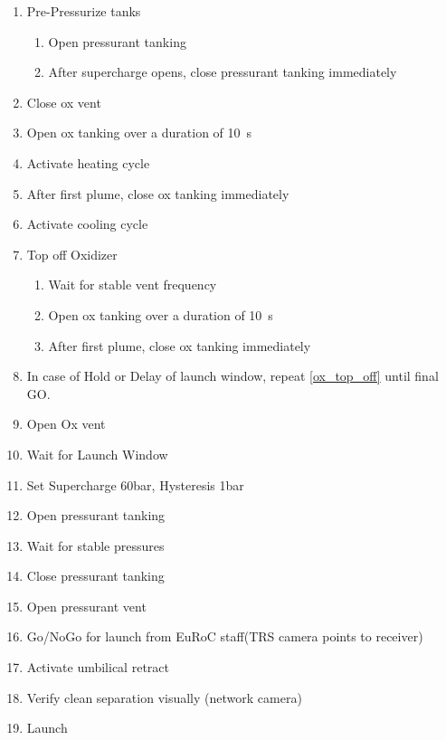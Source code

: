 \begin{enumerate}[label=L\arabic*.]
    \item Pre-Pressurize tanks\checkbox
     \begin{enumerate}[label*=\arabic*.]
            \item Open pressurant tanking \leftcheckbox
            \item After supercharge opens, close pressurant tanking immediately \leftcheckbox
      \end{enumerate}
    \item Close ox vent\checkbox
    \item Open ox tanking over a duration of \SI{10}{\second}\checkbox
    \item Activate heating cycle\checkbox
    \item After first plume, close ox tanking immediately\checkbox
    \item Activate cooling cycle\checkbox
    \item \label{ox_top_off} Top off Oxidizer
        \begin{enumerate}[label*=\arabic*.]
            \item Wait for stable vent frequency \leftcheckbox
            \item Open ox tanking over a duration of \SI{10}{\second} \leftcheckbox
            \item After first plume, close ox tanking immediately \leftcheckbox
        \end{enumerate}
    \item In case of Hold or Delay of launch window, repeat \ref{ox_top_off} until final GO.
    \item Open Ox vent\checkbox
    
    \item Wait for Launch Window\checkbox
    \item Set Supercharge 60bar, Hysteresis 1bar\checkbox
    \item Open pressurant tanking\checkbox
    \item Wait for stable pressures\checkbox
    \item Close pressurant tanking\checkbox    
    \item Open pressurant vent \checkbox
    
    \item Go/NoGo for launch from EuRoC staff\newline (TRS camera points to receiver)\checkbox
    \item Activate umbilical retract\checkbox
    \item Verify clean separation visually (network camera)\checkbox
    \item Launch\checkbox
    

\end{enumerate}
